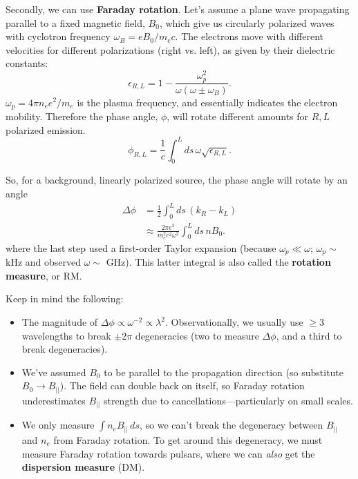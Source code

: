 \documentclass{tufte-handout}
\renewcommand{\textbf}[1]{{\bf \textcolor{dark-gray}{#1}}}
\begin{document}
Secondly, we can use \textbf{Faraday rotation}. Let's assume a plane wave propagating parallel to a fixed magnetic field, $B_0$, which give us circularly polarized waves with cyclotron frequency $\omega_B = eB_0/m_e c$. The electrons move with different velocities for different polarizations (right vs. left), as given by their dielectric constants:
\begin{equation}
\epsilon_{R,L} = 1 - \frac{\omega_p^2}{\omega(\omega \pm \omega_B)}.
\end{equation}
$\omega_p = 4\pi n_e e^2/m_e$ is the plasma frequency, and essentially indicates the electron mobility. Therefore the phase angle, $\phi$, will rotate different amounts for $R,L$ polarized emission.
\begin{equation}
\phi_{R,L} = \frac{1}{c}\int_0^L ds\, \omega\sqrt{\epsilon_{R,L}}.
\end{equation}

So, for a background, linearly polarized source, the phase angle will rotate by an angle
\begin{align}\label{eq:faraday rotation}
\Delta \phi &= \frac{1}{2}\int_0^L ds\,\left (k_R - k_L\right )\nonumber \\
&\approx \frac{2\pi e^3}{m_e^2 c^2 \omega^2}\int_0^L ds\, n B_0.
\end{align}
where the last step used a first-order Taylor expansion (because $\omega_p \ll \omega$; $\omega_p \sim$ kHz and observed $\omega \sim $ GHz). This latter integral is also called the \textbf{rotation measure}, or RM.

Keep in mind the following: 
\begin{itemize}
\item The magnitude of $\Delta \phi \propto \omega^{-2} \propto \lambda^2$. Observationally, we usually use $\geq 3$ wavelengths to break $\pm 2\pi$ degeneracies (two to measure $\Delta \phi$, and a third to break degeneracies).
\item We've assumed $B_0$ to be parallel to the propagation direction (so substitute $B_0 \rightarrow B_{||}$). The field can double back on itself, so Faraday rotation underestimates $B_{||}$ strength due to cancellations---particularly on small scales.
\item We only measure $\int n_e B_{||}\, ds$, so we can't break the degeneracy between $B_{||}$ and $n_e$ from Faraday rotation. To get around this degeneracy, we must measure Faraday rotation towards pulsars, where we can \textit{also} get the \textbf{dispersion measure} (DM).
\end{itemize}
\end{document}
